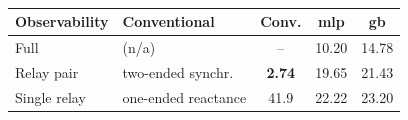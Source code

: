 \begin{table}[ht]
\caption{}
\label{tab:baselines_obs}
\small
\centering
\begin{revblock}
\begin{tabular}{llccc}
\toprule
\textbf{Observability} & \textbf{Conventional} & \textbf{Conv.} & \textbf{\ac{mlp}} & \textbf{\ac{gb}} \\
\midrule
Full         & (n/a)                & --   & 10.20 & 14.78 \\
Relay pair   & two-ended synchr.    & \textbf{2.74} & 19.65 & 21.43 \\
Single relay & one-ended reactance  & 41.9 & 22.22 & 23.20 \\
\bottomrule
\end{tabular}
\end{revblock}
\end{table}
